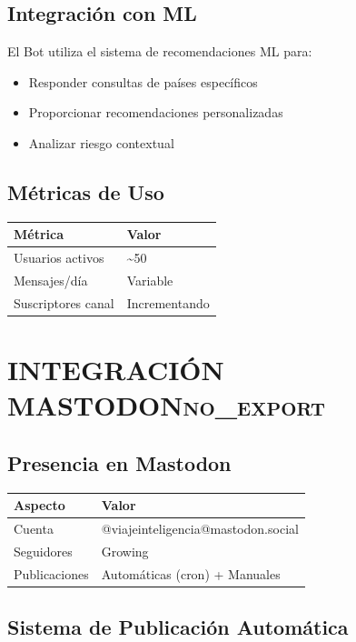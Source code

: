 \documentclass[11pt]{article}
\begin{document}
\subsection{Integración con ML}
\label{sec:org63df571}

El Bot utiliza el sistema de recomendaciones ML para:
\begin{itemize}
\item Responder consultas de países específicos
\item Proporcionar recomendaciones personalizadas
\item Analizar riesgo contextual
\end{itemize}

\subsection{Métricas de Uso}
\label{sec:orgebd2cd5}

\begin{center}
\begin{tabular}{ll}
Métrica & Valor\\
\hline
Usuarios activos & \textasciitilde{}50\\
Mensajes/día & Variable\\
Suscriptores canal & Incrementando\\
\end{tabular}
\end{center}

\section{INTEGRACIÓN MASTODON\hfill{}\textsc{no\_export}}
\label{sec:org7f38bb1}
\subsection{Presencia en Mastodon}
\label{sec:orgc340f90}

\begin{center}
\begin{tabular}{ll}
Aspecto & Valor\\
\hline
Cuenta & @viajeinteligencia@mastodon.social\\
Seguidores & Growing\\
Publicaciones & Automáticas (cron) + Manuales\\
\end{tabular}
\end{center}

\subsection{Sistema de Publicación Automática}
\label{sec:orgf765a69}
\end{document}

